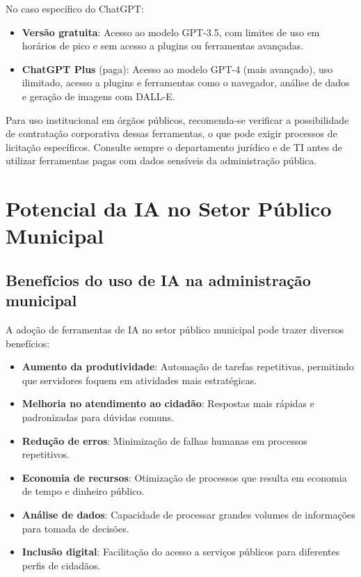 \documentclass[12pt,a4paper]{book}
\begin{document}
No caso específico do ChatGPT:
\begin{itemize}
    \item \textbf{Versão gratuita}: Acesso ao modelo GPT-3.5, com limites de uso em horários de pico e sem acesso a plugins ou ferramentas avançadas.
    \item \textbf{ChatGPT Plus} (paga): Acesso ao modelo GPT-4 (mais avançado), uso ilimitado, acesso a plugins e ferramentas como o navegador, análise de dados e geração de imagens com DALL-E.
\end{itemize}

\begin{tcolorbox}[atencao]
Para uso institucional em órgãos públicos, recomenda-se verificar a possibilidade de contratação corporativa dessas ferramentas, o que pode exigir processos de licitação específicos. Consulte sempre o departamento jurídico e de TI antes de utilizar ferramentas pagas com dados sensíveis da administração pública.
\end{tcolorbox}

\section{Potencial da IA no Setor Público Municipal}

\subsection{Benefícios do uso de IA na administração municipal}

A adoção de ferramentas de IA no setor público municipal pode trazer diversos benefícios:

\begin{itemize}
    \item \textbf{Aumento da produtividade}: Automação de tarefas repetitivas, permitindo que servidores foquem em atividades mais estratégicas.
    \item \textbf{Melhoria no atendimento ao cidadão}: Respostas mais rápidas e padronizadas para dúvidas comuns.
    \item \textbf{Redução de erros}: Minimização de falhas humanas em processos repetitivos.
    \item \textbf{Economia de recursos}: Otimização de processos que resulta em economia de tempo e dinheiro público.
    \item \textbf{Análise de dados}: Capacidade de processar grandes volumes de informações para tomada de decisões.
    \item \textbf{Inclusão digital}: Facilitação do acesso a serviços públicos para diferentes perfis de cidadãos.
\end{itemize}
\end{document}
